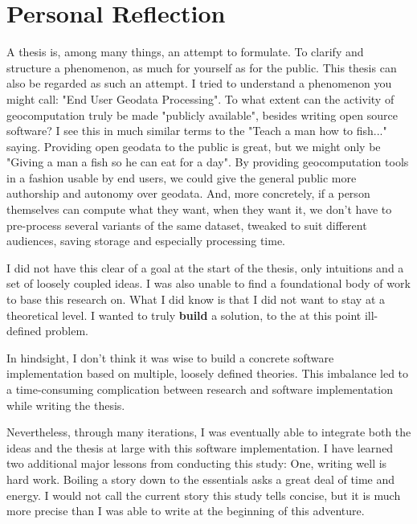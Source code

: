\newpage

\section{Personal Reflection}
\label{sec:personal-reflection}

A thesis is, among many things, an attempt to formulate. 
To clarify and structure a phenomenon, as much for yourself as for the public. 
This thesis can also be regarded as such an attempt. 
I tried to understand a phenomenon you might call: "End User Geodata Processing". 
To what extent can the activity of geocomputation truly be made "publicly available", besides writing open source software?
I see this in much similar terms to the "Teach a man how to fish..." saying.
Providing open geodata to the public is great, but we might only be "Giving a man a fish so he can eat for a day".
By providing geocomputation tools in a fashion usable by end users, we could give the general public more authorship and autonomy over geodata. 
And, more concretely, if a person themselves can compute what they want, when they want it, we don't have to pre-process several variants of the same dataset, tweaked to suit different audiences, saving storage and especially processing time.

I did not have this clear of a goal at the start of the thesis, only intuitions and a set of loosely coupled ideas.
I was also unable to find a foundational body of work to base this research on. 
What I did know is that I did not want to stay at a theoretical level. 
I wanted to truly \textbf{build} a solution, to the at this point ill-defined problem. 

In hindsight, I don't think it was wise to build a concrete software implementation based on multiple, loosely defined theories. 
This imbalance led to a time-consuming complication between research and software implementation while writing the thesis.

Nevertheless, through many iterations, I was eventually able to integrate both the ideas and the thesis at large with this software implementation.
I have learned two additional major lessons from conducting this study: 
One, writing well is hard work. 
Boiling a story down to the essentials asks a great deal of time and energy. 
I would not call the current story this study tells concise, but it is much more precise than I was able to write at the beginning of this adventure.

